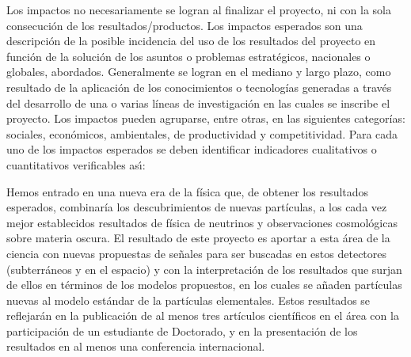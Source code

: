 \begin{instrucciones}
  Los impactos no necesariamente se logran al finalizar el proyecto, ni
con la sola consecución de los resultados/productos. Los impactos
esperados son una descripción de la posible incidencia del uso de los
resultados del proyecto en función de la solución de los asuntos o
problemas estratégicos, nacionales o globales, abordados. Generalmente
se logran en el mediano y largo plazo, como resultado de la aplicación
de los conocimientos o tecnologías generadas a través del desarrollo
de una o varias líneas de investigación en las cuales se inscribe el
proyecto. Los impactos pueden agruparse, entre otras, en las
siguientes categorías: sociales, económicos, ambientales, de
productividad y competitividad. Para cada uno de los impactos
esperados se deben identificar indicadores cualitativos o
cuantitativos verificables as\'\i:
\end{instrucciones}


Hemos entrado en una nueva era de la física que, de obtener los
resultados esperados, combinaría los descubrimientos de nuevas
partículas, a los cada vez mejor establecidos resultados de física de
neutrinos y observaciones cosmológicas sobre materia oscura. El
resultado de este proyecto es aportar a esta área de la ciencia con
nuevas propuestas de señales para ser buscadas en estos detectores
(subterráneos y en el espacio) y con la interpretación de los
resultados que surjan de ellos en términos de los modelos propuestos,
en los cuales se añaden partículas nuevas al modelo estándar de la
partículas elementales. Estos resultados se reflejarán en la
publicación de al menos tres artículos científicos en el área con la
participación de un estudiante de Doctorado, y en la presentación de
los resultados en al menos una conferencia internacional.


